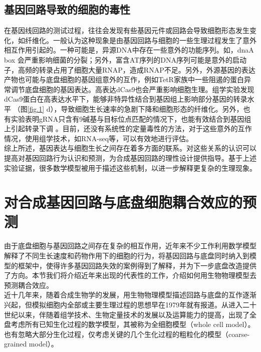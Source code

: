 \documentclass[b5paper,9pt,oneolumn,twoside,UTF8]{article}
\begin{document}
\subsection{基因回路导致的细胞的毒性}
在基因线回路的测试过程，往往会发现有些基因元件或回路会导致细胞形态发生变化，如纤维化。一般认为这种现象是由基因回路与细胞的一些生理过程发生了意外相互作用引起的。一种可能是，异源DNA中存在一些意外的功能序列。如，dnaA box 会严重影响细菌的分裂\cite{Kimelman2012}；另外，富含AT序列的DNA序列可能是意外的启动子，高频的转录占用了细胞大量RNAP，造成RNAP不足\cite{Lamberte2017}。另外，外源基因的表达产物也可能与底盘细胞的基因组意外的互作，例如TetR家族中一些阻遏的蛋白异常调节底盘细胞的基因表达\cite{Stanton2014, Hasnain2019}。高表达dCas9也会严重影响细胞生理。组学实验发现dCas9蛋白在高表达水平下，能够非特异性结合到基因组上影响部分基因的转录水平 \cite{Cho2018}（图\ref{fig.1} d），导致细胞生长速率的急剧下降和细胞形态的纤维化。另外，也有实验表明gRNA只含有9碱基与目标位点匹配的情况下，也能有效结合到基因组上引起转录下调 \cite{Cui2018}。目前，还没有系统性的定量毒性的方法，对于这些意外的互作情况，使用组学技术，如RNA-seq等\cite{Liu2018a}，可以有效地进行评估。\\
\indent 综上所述，基因表达与细胞生长之间存在着多方面的联系。对这些关系的认识可以提高对基因回路行为认识和预测，为合成基因回路的理性设计提供指导。基于上述实验证据，很多数学模型被用于描述这些机制，以进一步解释更复杂的生理现象。
\section{对合成基因回路与底盘细胞耦合效应的预测}
由于底盘细胞与基因回路之间存在复杂的相互作用，近年来不少工作利用数学模型解释了不同生长速度和药物作用下的细胞的行为\cite{Scott2010}，将基因回路与底盘同时纳入到模型的框架中，使得许多基因回路失效的案例得到了解释，并为下一步底盘改造提供了方向。本节我们将介绍近年来出现的代表性的工作，介绍如何用生物物理模型去预测耦合效应。\\
\indent 近十几年来，随着合成生物学的发展，用生物物理模型描述回路与底盘的互作逐渐兴起，但模拟细胞内全部或主要生理过程的思想早在1979年就有报道\cite{Shuler1979}。从进入二十世纪以来，伴随着组学技术、生物定量技术的发展以及运算能力的提高，出现了全盘考虑所有已知生化过程的数学模型，其被称为全细胞模型（whole cell model）\cite{Tomita1999, carrera2015build, karr2012whole}。也有忽略大部分生化过程，仅考虑关键的几个生化过程的粗粒化的模型（coarse-grained model）\cite{Scott2010, Weiße2015,Liao2017}。 
\end{document}
